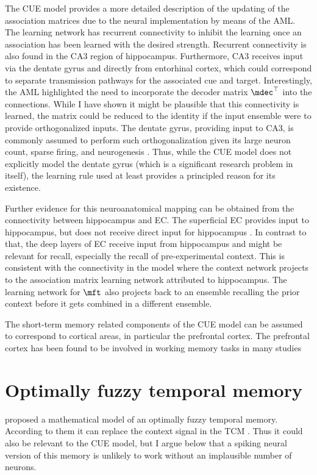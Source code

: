 The CUE model provides a more detailed description of the updating of the association matrices due to the neural implementation by means of the AML\@.
The learning network has recurrent connectivity to inhibit the learning once an association has been learned with the desired strength.
Recurrent connectivity is also found in the CA3 region of hippocampus.
Furthermore, CA3 receives input via the dentate gyrus and directly from entorhinal cortex, which could correspond to separate transmission pathways for the associated cue and target.
Interestingly, the AML highlighted the need to incorporate the decoder matrix $\mdec\Tr$ into the connections.
While I have shown it might be plausible that this connectivity is learned, the matrix could be reduced to the identity if the input ensemble were to provide orthogonalized inputs.
The dentate gyrus, providing input to CA3, is commonly assumed to perform such orthogonalization given its large neuron count, sparse firing, and neurogenesis \parencite[e.g.,][]{boss1987,jung1993-1,piatti2013}.
Thus, while the CUE model does not explicitly model the dentate gyrus (which is a significant research problem in itself), the learning rule used at least provides a principled reason for its existence.

Further evidence for this neuroanatomical mapping can be obtained from the connectivity between hippocampus and EC\@.
The superficial EC provides input to hippocampus, but does not receive direct input for hippocampus \parencite{witter2010}.
In contrast to that, the deep layers of EC receive input from hippocampus and might be relevant for recall, especially the recall of pre-experimental context.
This is consistent with the connectivity in the model where the context network projects to the association matrix learning network attributed to hippocampus.
The learning network for $\mft$ also projects back to an ensemble recalling the prior context before it gets combined in a different ensemble.

The short-term memory related components of the CUE model can be assumed to correspond to cortical areas, in particular the prefrontal cortex.
The prefrontal cortex has been found to be involved in working memory tasks in many studies \parencite[e.g.,][]{goldman-rakic1995,owen1997}


\section{Optimally fuzzy temporal memory}\label{sec:fuzzymem}
\Textcite{shankar2013} proposed a mathematical model of an optimally fuzzy temporal memory.
According to them it can replace the context signal in the TCM \parencite{howard2015}.
Thus it could also be relevant to the CUE model, but I argue below that a spiking neural version of this memory is unlikely to work without an implausible number of neurons.

